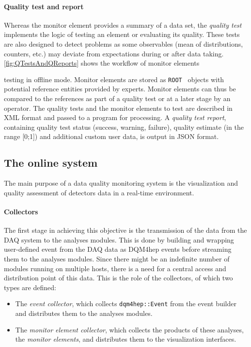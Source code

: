 \documentclass{webofc}
\begin{document}
{\paragraph{Quality test and report}

Whereas the monitor element provides a summary of a data set, the \textit{quality test} implements the logic of testing an element or evaluating its quality.
These tests are also designed to detect problems as some observables (mean of distributions, counters, etc.) may deviate from expectations during or after data taking. \autoref{fig:QTestsAndQReports} shows the workflow of monitor elements 

} %
\noindent testing in offline mode.
Monitor elements are stored as \texttt{ROOT}~\cite{ROOT} objects with potential reference entities provided by experts.
Monitor elements can thus be compared to the references as part of a quality test or at a later stage by an operator. 
The quality tests and the monitor elements to test are described in XML format and passed to a program for processing.
A \textit{quality test report}, containing quality test status (success, warning, failure), quality estimate (in the range [0;1]) and additional custom user data, is output in JSON format.

\subsection{The online system}
\label{subsec:online}
The main purpose of a data quality monitoring system is the visualization and quality assessment of detectors data in a real-time environment.

\paragraph{Collectors}\label{par:Collectors}
The first stage in achieving this objective is the transmission of the data from the DAQ system to the analyses modules.
This is done by building and wrapping user-defined event from the DAQ data as DQM4hep events before streaming them to the analyses modules.
Since there might be an indefinite number of modules running on multiple hosts, there is a need for a central access and distribution point of this data. This is the role of the collectors, of which two types are defined:

\begin{itemize}
  \item The \textit{event collector}, which collects \texttt{dqm4hep::Event} from the event builder and distributes them to the analyses modules. 
  \item The \textit{monitor element collector}, which collects the products of these analyses, the \textit{monitor elements}, and distributes them to the visualization interfaces.
\end{itemize}
\end{document}
